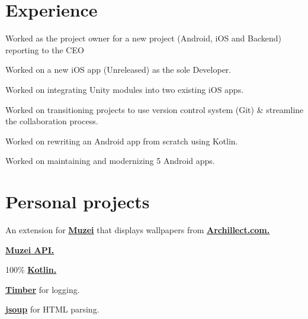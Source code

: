 \documentclass[]{Resume}
\begin{document}
\begin{minipage}[t]{0.66\textwidth} 


\section{Experience}
\vspace{\topsep} %
\begin{tightemize}
\item Worked as the project owner for a new project (Android, iOS and Backend) reporting to the CEO
\item Worked on a new iOS app (Unreleased) as the sole Developer.
\item Worked on integrating Unity modules into two existing iOS apps.
\item Worked on transitioning projects to use version control system (Git) \& streamline the collaboration process.
\item Worked on rewriting an Android app from scratch using Kotlin.
\item Worked on maintaining and modernizing 5 Android apps.
\end{tightemize}
\sectionsep


\section{Personal projects}
An extension for \textbf{\href{http://muzei.co}{Muzei}} that displays wallpapers from \textbf{\href{http://Archillect.com}{Archillect.com.}}
\begin{tightemize}
\item \textbf{\href{http://api.muzei.co}{Muzei API.}}
\item 100\% \textbf{\href{http://kotlinlang.org}{Kotlin.}}
\item \textbf{\href{http://github.com/JakeWharton/timber}{Timber}} for logging.
\item \textbf{\href{http://jsoup.org}{jsoup}} for HTML parsing.
\end{tightemize}
\sectionsep


\end{minipage}
\end{document}
